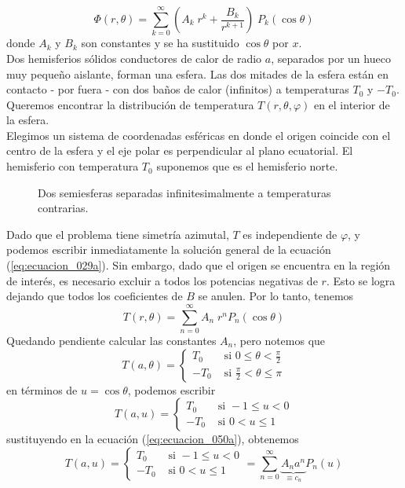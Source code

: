 \begin{equation}
\Phi (r, \theta) = \sum_{k=0}^{\infty} \left( A_{k} \; r^{k} + \dfrac{B_{k}}{r^{k+1}} \right) \; P_{k} (\cos \theta)
\label{eq:ecuacion_029a}
\end{equation}
donde $A_{k}$ y $B_{k}$ son constantes y se ha sustituido $\cos \theta$ por $x$.
\\
Dos hemisferios sólidos conductores de calor de radio $a$, separados por un hueco muy pequeño aislante, forman una esfera. Las dos mitades de la esfera están en contacto - por fuera - con dos baños de calor (infinitos) a temperaturas $T_{0}$ y $-T_{0}$. Queremos encontrar la distribución de temperatura $T (r, \theta, \varphi)$ en el interior de la esfera.
\\
Elegimos un sistema de coordenadas esféricas en donde el origen coincide con el centro de la esfera y el eje polar es perpendicular al plano ecuatorial. El hemisferio con temperatura $T_{0}$ suponemos que es el hemisferio norte.
\begin{figure}[H]
\centering

\caption{Dos semiesferas separadas infinitesimalmente a temperaturas contrarias.}
\label{fig:figura2}
\end{figure}
Dado que el problema tiene simetría azimutal, $T$ es independiente de $\varphi$, y podemos escribir inmediatamente la solución general de la ecuación (\ref{eq:ecuacion_029a}). Sin embargo, dado que el origen se encuentra en la región de interés, es necesario excluir a todos los potencias negativas de $r$. Esto se logra dejando que todos los coeficientes de $B$ se anulen. Por lo tanto, tenemos
\begin{equation}
T(r, \theta) = \sum_{n=0}^{\infty} A_{n} \; r^{n} P_{n} (\cos \theta)
\label{eq:ecuacion_050a}
\end{equation}
Quedando pendiente calcular las constantes $A_{n}$, pero notemos que
\[  T(a, \theta) = 
\begin{cases}
T_{0} & \mbox{ si } 0 \leq \theta < \frac{\pi}{2} \\
-T_{0} & \mbox{ si } \frac{\pi}{2} < \theta \leq \pi 
\end{cases} \]
en términos de $u= \cos \theta$, podemos escribir
\[  T(a, u) = 
\begin{cases}
T_{0} & \mbox{ si } -1 \leq u < 0 \\
-T_{0} & \mbox{ si } 0 < u \leq 1 
\end{cases} \]
sustituyendo en la ecuación (\ref{eq:ecuacion_050a}), obtenemos
\begin{equation} 
T(a, u) = 
\begin{cases}
T_{0} & \mbox{ si } -1 \leq u < 0 \\
-T_{0} & \mbox{ si } 0 < u \leq 1 
\end{cases} =
\sum_{n=0}^{\infty} \underbrace{A_{n} a^{n}}_{\equiv c_{n}} P_{n}(u)
\label{eq:ecuacion_051a}
\end{equation}
